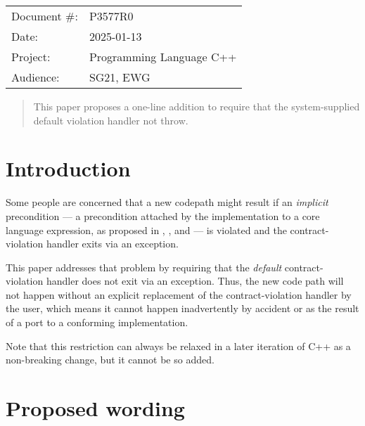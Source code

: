 \begin{tabular}{ll}
Document \#: & P3577R0 \\
Date: &2025-01-13 \\
Project: & Programming Language C++ \\
Audience: & SG21, EWG
\end{tabular}

\begin{abstract}
This paper proposes a one-line addition to require that the system-supplied default violation handler not throw.
\end{abstract}








\section{Introduction}

Some people are concerned that a new codepath might result if an \emph{implicit} precondition --- a precondition attached by the implementation to a core language expression, as proposed in \cite{P3081R1}, \cite{P3100R1}, and \cite{P3329R0} --- is violated and the contract-violation handler exits via an exception.

This paper addresses that problem by requiring that the \emph{default} contract-violation handler does not exit via an exception. Thus, the new code path will not happen without an explicit replacement of the contract-violation handler by the user, which means it cannot happen inadvertently by accident or as the result of a port to a conforming implementation.

Note that this restriction can always be relaxed in a later iteration of C++ as a non-breaking change, but it cannot be so added.

\section{Proposed wording}

